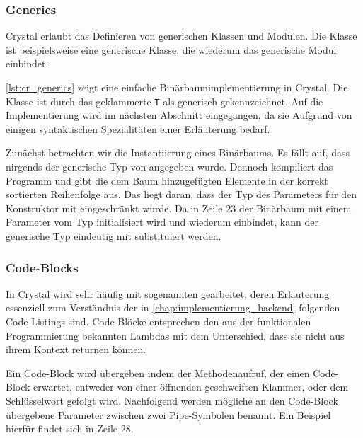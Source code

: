 \subsubsection{Generics}
\label{sssec:gsc_generics}

Crystal erlaubt das Definieren von generischen Klassen und Modulen.  Die Klasse
 ist beispielsweise eine generische Klasse, die wiederum das
generische Modul  einbindet.

\cref{lst:cr_generics} zeigt eine einfache Binärbaumimplementierung in Crystal.
Die Klasse  ist durch das geklammerte \texttt{T} als generisch
gekennzeichnet.  Auf die Implementierung wird im nächsten Abschnitt eingegangen,
da sie Aufgrund von einigen syntaktischen Spezialitäten einer Erläuterung
bedarf.

Zunächst betrachten wir die Instantiierung eines Binärbaums.  Es fällt auf, dass
nirgends der generische Typ von  angegeben wurde.  Dennoch
kompiliert das Programm und gibt die dem Baum hinzugefügten Elemente in der
korrekt sortierten Reihenfolge aus.  Das liegt daran, dass der Typ des
Parameters für den Konstruktor mit  eingeschränkt wurde.  Da
in Zeile 23 der Binärbaum mit einem Parameter vom Typ 
initialisiert wird und  wiederum 
einbindet, kann der generische Typ eindeutig mit  substituiert
werden.



\subsubsection{Code-Blocks}
\label{sssec:gsc_code_blocks}

In Crystal wird sehr häufig mit sogenannten 
gearbeitet, deren Erläuterung essenziell zum Verständnis der in
\cref{chap:implementierung_backend} folgenden Code-Listings sind.  Code-Blöcke
entsprechen den aus der funktionalen Programmierung bekannten Lambdas mit dem
Unterschied, dass sie nicht aus ihrem Kontext returnen können.

Ein Code-Block wird übergeben indem der Methodenaufruf, der einen Code-Block
erwartet, entweder von einer öffnenden geschweiften Klammer, oder dem
Schlüsselwort  gefolgt wird.  Nachfolgend werden mögliche an den
Code-Block übergebene Parameter zwischen zwei Pipe-Symbolen benannt.  Ein
Beispiel hierfür findet sich in Zeile 28.

